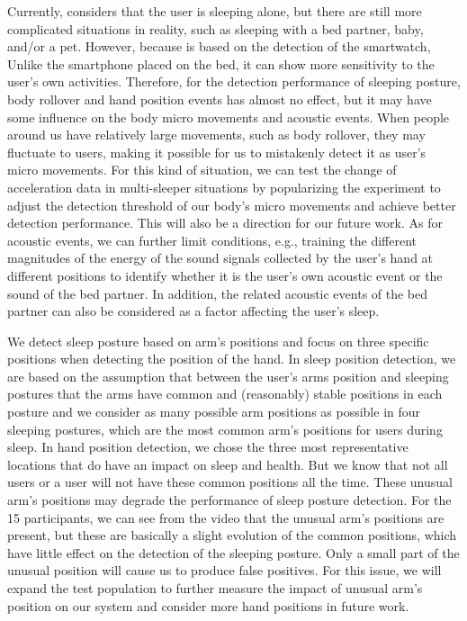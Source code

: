  Currently, {\systemname} considers that the user is sleeping alone, but there are still more
complicated situations in reality, such as sleeping with a bed partner, baby, and/or a pet. However, because {\systemname} is based on the
detection of the smartwatch, Unlike the smartphone placed on the bed, it can show more sensitivity to the user's own activities. Therefore,
for the detection performance of sleeping posture, body rollover and hand position events has almost no effect, but it may have some
influence on the body micro movements and acoustic events. When people around us have relatively large movements, such as body rollover,
they may fluctuate to users, making it possible for us to mistakenly detect it as user's micro movements. For this kind of situation, we
can test the change of acceleration data in multi-sleeper situations by popularizing the experiment to adjust the detection threshold of
our body's micro movements and achieve better detection performance. This will also be a direction for our future work. As for acoustic
events, we can further limit conditions, e.g., training the different magnitudes of the energy of the sound signals collected by the user's
hand at different positions to identify whether it is the user's own acoustic event or the sound of the bed partner. In addition, the
related acoustic events of the bed partner can also be considered as a factor affecting the user's sleep.

 We detect sleep posture based on arm's positions and focus on three specific positions
when detecting the position of the hand. In sleep position detection, we are based on the assumption that between the user's arms position
and sleeping postures that the arms have common and (reasonably) stable positions in each posture and we consider as many possible arm
positions as possible in four sleeping postures, which are the most common arm's positions for users during sleep. In hand position
detection, we chose the three most representative locations that do have an impact on sleep and health. But we know that not all users or a
user will not have these common positions all the time. These unusual arm's positions may degrade the performance of sleep posture
detection. For the 15 participants, we can see from the video that the unusual arm's positions are present, but these are basically a
slight evolution of the common positions, which have little effect on the detection of the sleeping posture. Only a small part of the
unusual position will cause us to produce false positives. For this issue, we will expand the test population to further measure the impact
of unusual arm's position on our system and consider more hand positions in future work.

